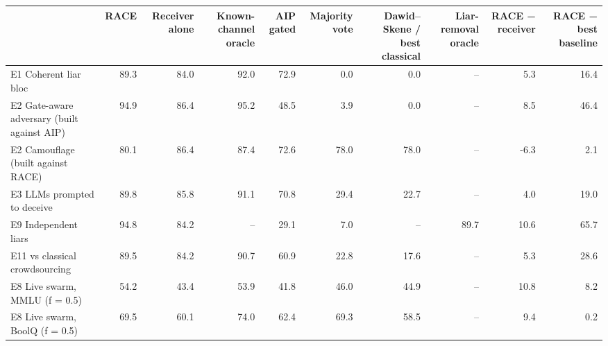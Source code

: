\begin{tabular}{lrrrrrrrrr}
\toprule
 & RACE & Receiver alone & Known-channel oracle & AIP gated & Majority vote & Dawid–Skene / best classical & Liar-removal oracle & RACE − receiver & RACE − best baseline \\
\midrule
E1  Coherent liar bloc & 89.3 & 84.0 & 92.0 & 72.9 & 0.0 & 0.0 & -- & 5.3 & 16.4 \\
E2  Gate-aware adversary (built against AIP) & 94.9 & 86.4 & 95.2 & 48.5 & 3.9 & 0.0 & -- & 8.5 & 46.4 \\
E2  Camouflage (built against RACE) & 80.1 & 86.4 & 87.4 & 72.6 & 78.0 & 78.0 & -- & -6.3 & 2.1 \\
E3  LLMs prompted to deceive & 89.8 & 85.8 & 91.1 & 70.8 & 29.4 & 22.7 & -- & 4.0 & 19.0 \\
E9  Independent liars & 94.8 & 84.2 & -- & 29.1 & 7.0 & -- & 89.7 & 10.6 & 65.7 \\
E11 vs classical crowdsourcing & 89.5 & 84.2 & 90.7 & 60.9 & 22.8 & 17.6 & -- & 5.3 & 28.6 \\
E8  Live swarm, MMLU (f = 0.5) & 54.2 & 43.4 & 53.9 & 41.8 & 46.0 & 44.9 & -- & 10.8 & 8.2 \\
E8  Live swarm, BoolQ (f = 0.5) & 69.5 & 60.1 & 74.0 & 62.4 & 69.3 & 58.5 & -- & 9.4 & 0.2 \\
\bottomrule
\end{tabular}
